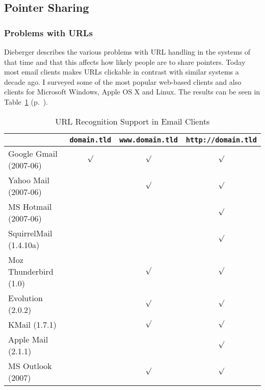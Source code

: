 \documentclass[12pt,a4paper]{article}
\begin{document}
\subsection{Pointer Sharing}

\subsubsection{Problems with URLs}

Dieberger describes the various problems with URL handling in the systems of
that time and that this affects how likely people are to share pointers. Today
most email clients makes URLs clickable in contrast with similar systems a
decade ago. I surveyed some of the most popular web-based clients and also
clients for Microsoft Windows, Apple OS X and Linux. The results can be seen
in Table~\ref{table:email} (p.~\pageref{table:email}).

\begin{table}[h!b!p!]
  \caption{URL Recognition Support in Email Clients}
  \label{table:email}
  \begin{center}
    \begin{small}
      \begin{tabular}{l|ccc}
        &
        \texttt{domain.tld} &
        \texttt{www.domain.tld} &
        \texttt{http://domain.tld} \\
        \hline
        Google Gmail (2007-06) & $\surd$ & $\surd$ & $\surd$ \\
        Yahoo Mail (2007-06)   &         & $\surd$ & $\surd$ \\
        MS Hotmail (2007-06)   &         &         & $\surd$ \\
        SquirrelMail (1.4.10a) &         &         & $\surd$ \\
        Moz Thunderbird (1.0)  &         & $\surd$ & $\surd$ \\
        Evolution (2.0.2)      &         & $\surd$ & $\surd$ \\
        KMail (1.7.1)          &         & $\surd$ & $\surd$ \\
        Apple Mail (2.1.1)     &         &         & $\surd$ \\
        MS Outlook (2007)      &         & $\surd$ & $\surd$ \\
      \end{tabular}
    \end{small}
  \end{center}
\end{table}
\end{document}

